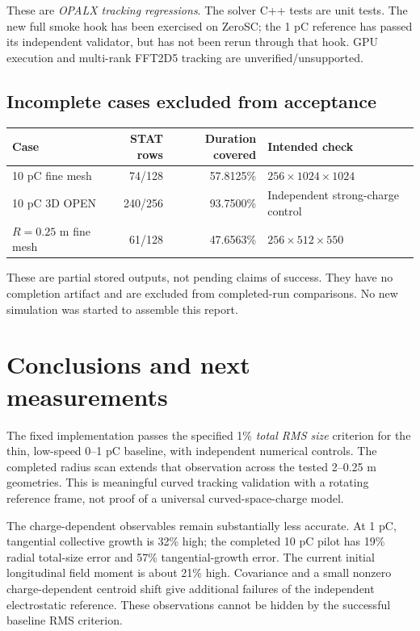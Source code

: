 \documentclass[10pt,a4paper]{article}
\begin{document}
These are \emph{OPALX tracking regressions}. The solver C++ tests are unit tests.
The new full smoke hook has been exercised on ZeroSC; the 1 pC reference has
passed its independent validator, but has not been rerun through that hook.
GPU execution and multi-rank FFT2D5 tracking are unverified/unsupported.

\subsection{Incomplete cases excluded from acceptance}
\begin{center}\small
\begin{tabular}{lrrl}\toprule
Case & STAT rows & Duration covered & Intended check\\\midrule
10 pC fine mesh & 74/128 & 57.8125\% & $256\times1024\times1024$\\
10 pC 3D OPEN & 240/256 & 93.7500\% & Independent strong-charge control\\
$R=0.25$ m fine mesh & 61/128 & 47.6563\% & $256\times512\times550$\\\bottomrule
\end{tabular}
\end{center}
These are partial stored outputs, not pending claims of success. They have no
completion artifact and are excluded from completed-run comparisons. No new
simulation was started to assemble this report.

\clearpage
\section{Conclusions and next measurements}
The fixed implementation passes the specified 1\% \emph{total RMS size}
criterion for the thin, low-speed 0--1 pC baseline, with independent numerical
controls. The completed radius scan extends that observation across the tested
2--0.25 m geometries. This is meaningful curved tracking validation with a
rotating reference frame, not proof of a universal curved-space-charge model.

The charge-dependent observables remain substantially less accurate. At 1 pC,
tangential collective growth is 32\% high; the completed 10 pC pilot has 19\%
radial total-size error and 57\% tangential-growth error. The current initial
longitudinal field moment is about 21\% high. Covariance and a small nonzero
charge-dependent centroid shift give additional failures of the independent
electrostatic reference. These observations cannot be hidden by the successful
baseline RMS criterion.
\end{document}
